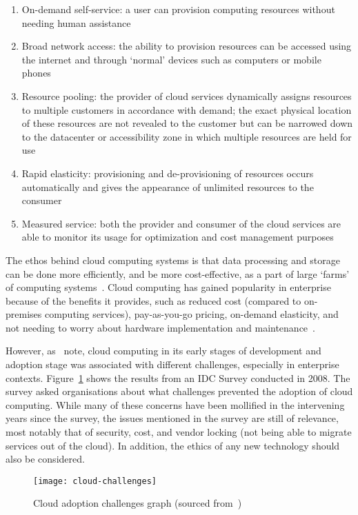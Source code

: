 \begin{enumerate}
    \item On-demand self-service: a user can provision computing resources without needing human assistance
    \item Broad network access: the ability to provision resources can be accessed using the internet and through `normal' devices such as computers or mobile phones
    \item Resource pooling: the provider of cloud services dynamically assigns resources to multiple customers in accordance with demand; the exact physical location of these resources are not revealed to the customer but can be narrowed down to the datacenter or accessibility zone in which multiple resources are held for use
    \item Rapid elasticity: provisioning and de-provisioning of resources occurs automatically and gives the appearance of unlimited resources to the consumer
    \item Measured service: both the provider and consumer of the cloud services are able to monitor its usage for optimization and cost management purposes
\end{enumerate}

The ethos behind cloud computing systems is that data processing and storage can be done more efficiently, and be more cost-effective, as a part of large `farms' of computing systems~\citep{marinescu-cloud}.
Cloud computing has gained popularity in enterprise because of the benefits it provides,
such as reduced cost (compared to on-premises computing services), pay-as-you-go pricing, on-demand elasticity,
and not needing to worry about hardware implementation and maintenance~\citep{kumar-cloud}.

However, as~\citet{cc_challenges} note,
cloud computing in its early stages of development and adoption stage was associated with different challenges,
 especially in enterprise contexts.
Figure~\ref{fig:cloud-challenges} shows the results from an IDC Survey conducted in 2008.
The survey asked organisations about what challenges prevented the adoption of cloud computing.
While many of these concerns have been mollified in the intervening years since the survey,
the issues mentioned in the survey are still of relevance, most notably that of security, cost, and vendor locking (not being able to migrate services out of the cloud).
In addition, the ethics of any new technology should also be considered.

\begin{figure}[!htb]
    \centering
    \texttt{[image: cloud-challenges]}
    \caption{Cloud adoption challenges graph (sourced from~\citet{cc_challenges})}\label{fig:cloud-challenges}
\end{figure}

